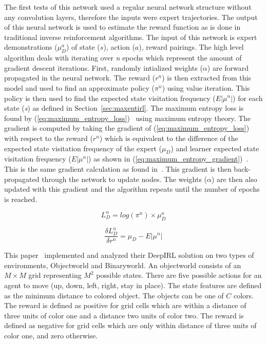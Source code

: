 \documentclass[12pt,american]{report}
\begin{document}
The first tests of this network used a regular neural network structure without any convolution layers, therefore the inputs were expert trajectories. The output of this neural network is used to estimate the reward function as is done in traditional inverse reinforcement algorithms. The input of this network is expert demonstrations ($\mu_{D}^{a}$) of state ($s$), action ($a$), reward pairings. The high level algorithm deals with iterating over \textit{n} epochs which represent the amount of gradient descent iterations. First, randomly intialized weights ($\alpha$) are forward propagated in the neural network.  The reward ($r^n$) is then extracted from this model and used to find an approximate policy ($\pi^n$) using value iteration. This policy is then used to find the expected state visitation frequency ($E|\mu^n|$) for each state (\textit{s}) as defined in Section~\ref{sec:maxentirl}.  The maximum entropy loss is found by (\ref{eq:maximum_entropy_loss})~\cite{wulfmeier2015maximum} using maximum entropy theory. The gradient is computed by taking the gradient of (\ref{eq:maximum_entropy_loss}) with respect to the reward ($r^n$) which is equivalent to the difference of the expected state visitation frequency of the expert ($\mu_D$) and learner expected state visitation frequency ($E|\mu^n|$) as shown in (\ref{eq:maximum_entropy_gradient})~\cite{wulfmeier2015maximum}.  This is the same gradient calculation as found in~\cite{ziebart2008maximum}.  This gradient is then back-propagated through the network to update nodes.  The weights ($\alpha$) are then also updated with this gradient and the algorithm repeats until the number of epochs is reached. 

\begin{equation}
            \label{eq:maximum_entropy_loss}
            L_{D}^{n}=log(\pi^n) \times \mu_{D}^{a}%
        \end{equation}

\begin{equation}
            \label{eq:maximum_entropy_gradient}
           \frac{\delta L_{D}^{n}}{\delta r^{n}}=\mu_D -  E|\mu^n|%
        \end{equation}

This paper~\cite{wulfmeier2015maximum} implemented and analyzed their DeepIRL solution on two types of environments, Objectworld and Binaryworld. An objectworld consists of an $M\times M$ grid representing $M^2$ possible states.  There are five possible actions for an agent to move (up, down, left, right, stay in place). The state features are defined as the minimum distance to colored object.  The objects can be one of $C$ colors. The reward is defined as positive for grid cells which are within a distance of three units of color one and a distance two units of color two. The reward is defined as negative for grid cells which are only within distance of three units of color one, and zero otherwise.  
\end{document}
